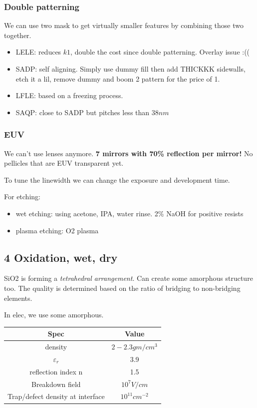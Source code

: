 \documentclass[
]{article}
\providecommand{\tightlist}{%
  \setlength{\itemsep}{0pt}\setlength{\parskip}{0pt}}
\begin{document}
\subsubsection{Double patterning}\label{double-patterning}

We can use two mask to get virtually smaller features by combining those
two together.

\begin{itemize}
\tightlist
\item
  LELE: reduces \(k1\), double the cost since double patterning. Overlay
  issue :((
\item
  SADP: self aligning. Simply use dummy fill then add THICKKK sidewalls,
  etch it a lil, remove dummy and boom 2 pattern for the price of 1.
\item
  LFLE: based on a freezing process.
\item
  SAQP: close to SADP but pitches less than \(38 nm\)
\end{itemize}

\subsubsection{EUV}\label{euv}

We can't use lenses anymore. \textbf{7 mirrors with 70\% reflection per
mirror!} No pellicles that are EUV transparent yet.

To tune the linewidth we can change the exposure and development time.

For etching:

\begin{itemize}
\tightlist
\item
  wet etching: using acetone, IPA, water rinse. 2\% NaOH for positive
  resists
\item
  plasma etching: O2 plasma
\end{itemize}

\subsection{4 Oxidation, wet, dry}\label{oxidation-wet-dry}

SiO2 is forming a \emph{tetrahedral arrangement}. Can create some
amorphous structure too. The quality is determined based on the ratio of
bridging to non-bridging elements.

In elec, we use some amorphous.

\begin{longtable}[]{@{}cc@{}}
\toprule\noalign{}
Spec & Value \\
\midrule\noalign{}
\endhead
\bottomrule\noalign{}
\endlastfoot
density & \(2-2.3 gm/cm^3\) \\
\(\varepsilon_r\) & 3.9 \\
reflection index n & 1.5 \\
Breakdown field & \(10^7 V/cm\) \\
Trap/defect density at interface & \(10^{11} cm^{-2}\) \\
\end{longtable}
\end{document}
